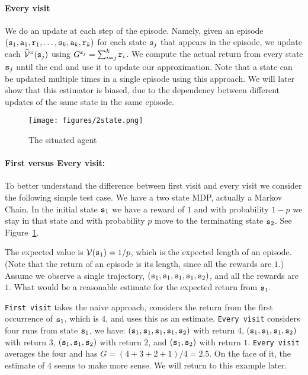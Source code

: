 \paragraph{Every visit}
We do an update at each step of the episode. Namely, given an
episode $({\tt s}_1, {\tt a}_1, {\tt r}_1, \ldots ,
{\tt s}_k,{\tt a}_k,{\tt r}_k)$ for each state ${\tt s}_j$ that
appears in the episode, we update each
$\widehat{\mathcal{V}}^\pi({\tt s}_j)$ using
$G^{{\tt s}_j}=\sum_{i=j}^k {\tt r}_i$. We compute the actual
return from every state ${\tt s}_j$ until the end and use it to update
our approximation. Note that a state can be updated multiple times
in  a single episode using this approach. We will later show that
this estimator is biased, due to the dependency between different
updates of the same state in the same episode.



\begin{figure}
  \begin{centering}
 \texttt{[image: figures/2state.png]}\\
  \caption{The situated agent}\label{fig:2state}
  \end{centering}
\end{figure}

\paragraph{First versus Every visit:}
%
To better understand the difference between first visit and every
visit we consider the following simple test case. We have a two
state MDP, actually a Markov Chain. In the initial state ${\tt s}_1$
we have a reward of $1$ and with probability $1-p$ we stay in that
state and with probability $p$ move to the terminating state
${\tt s}_2$. See Figure~\ref{fig:2state}.

The expected value is $\mathcal{V}({\tt s}_1)=1/p$, which is the expected
length of an episode. (Note that the return of an episode is its
length, since all the rewards are $1$.) Assume we observe a single
trajectory, $({\tt s}_1,{\tt s}_1,{\tt s}_1,{\tt s}_1,{\tt s}_2)$, and
all the rewards are $1$. What would be a reasonable estimate for the
expected return from ${\tt s}_1$.

{\tt First visit} takes the naive approach, considers the return from
the first occurrence of ${\tt s}_1$, which is $4$, and uses this as
an estimate. {\tt Every visit} considers four runs from state
${\tt s}_1$, we have:
$({\tt s}_1,{\tt s}_1,{\tt s}_1,{\tt s}_1,{\tt s}_2)$ with return $4$,
$({\tt s}_1,{\tt s}_1,{\tt s}_1,{\tt s}_2)$ with return $3$,
$({\tt s}_1,{\tt s}_1,{\tt s}_2)$ with return $2$, and
$({\tt s}_1,{\tt s}_2)$ with return $1$. {\tt Every visit} averages
the four and has $G=(4+3+2+1)/4=2.5$. On the face of it, the
estimate of $4$ seems to make more sense. We will return to this
example later.

